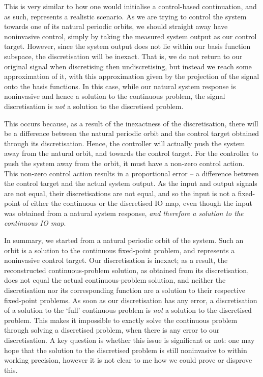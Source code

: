 \documentclass[11pt]{article}
\begin{document}
This is very similar to how one would initialise a control-based continuation, and as such, represents a realistic scenario.
As we are trying to control the system towards one of its natural periodic orbits, we should straight away have noninvasive control, simply by taking the measured system output as our control target.
However, since the system output does not lie within our basis function subspace, the discretisation will be inexact.
That is, we do not return to our original signal when discretising then undiscretising, but instead we reach some approximation of it, with this approximation given by the projection of the signal onto the basis functions.
In this case, while our natural system response is noninvasive and hence a solution to the continuous problem, the signal discretisation is \emph{not} a solution to the discretised problem.

This occurs because, as a result of the inexactness of the discretisation, there will be a difference between the natural periodic orbit and the control target obtained through its discretisation.
Hence, the controller will actually push the system away from the natural orbit, and towards the control target.
For the controller to push the system away from the orbit, it must have a non-zero control action.
This non-zero control action results in a proportional error -- a difference between the control target and the actual system output.
As the input and output signals are not equal, their discretisations are not equal, and so the input is not a fixed-point of either the continuous or the discretised IO map, even though the input was obtained from a natural system response, \emph{and therefore a solution to the continuous IO map}.

In summary, we started from a natural periodic orbit of the system.
Such an orbit is a solution to the continuous fixed-point problem, and represents a noninvasive control target.
Our discretisation is inexact; as a result, the reconstructed continuous-problem solution, as obtained from its discretisation, does not equal the actual continuous-problem solution, and neither the discretisation nor its corresponding function are a solution to their respective fixed-point problems.
As soon as our discretisation has any error, a discretisation of a solution to the `full' continuous problem is \emph{not} a solution to the discretised problem.
This makes it impossible to exactly solve the continuous problem through solving a discretised problem, when there is any error to our discretisation.
A key question is whether this issue is significant or not: one may hope that the solution to the discretised problem is still noninvasive to within working precision, however it is not clear to me how we could prove or disprove this.
\end{document}
